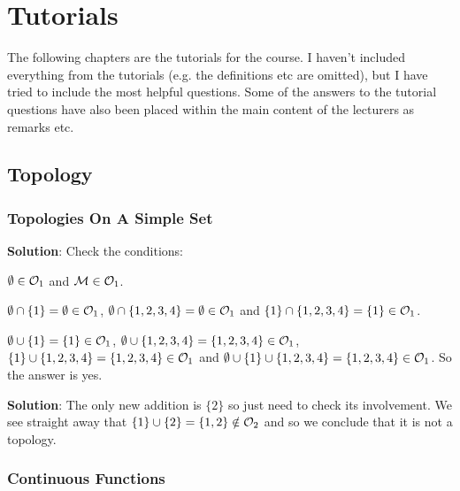 \chapter{Tutorials}

\begin{center}
    The following chapters are the tutorials for the course. I haven't included everything from the tutorials (e.g. the definitions etc are omitted), but I have tried to include the most helpful questions. Some of the answers to the tutorial questions have also been placed within the main content of the lecturers as remarks etc. 
\end{center}

\section{Topology}

\subsection{Topologies On A Simple Set}


\textbf{Solution}: Check the conditions:
\benr 
    \item $\emptyset\in\mathcal{O}_1$ and $\mathcal{M} \in \mathcal{O}_1$. 
    \item $\emptyset\cap\{1\} = \emptyset\in\mathcal{O}_1$, $\emptyset\cap\{1,2,3,4\}=\emptyset\in\mathcal{O}_1$ and $\{1\}\cap\{1,2,3,4\}=\{1\}\in\mathcal{O}_1$. 
    \item $\emptyset\cup\{1\}=\{1\} \in\mathcal{O}_1$, $\emptyset\cup\{1,2,3,4\}=\{1,2,3,4\}\in\mathcal{O}_1$, $\{1\}\cup\{1,2,3,4\}=\{1,2,3,4\}\in\mathcal{O}_1$ and $\emptyset\cup\{1\}\cup\{1,2,3,4\}=\{1,2,3,4\}\in\mathcal{O}_1$.
\een 
So the answer is yes. 

\textbf{Solution}: The only new addition is $\{2\}$ so just need to check its involvement. We see straight away that $\{1\}\cup\{2\} = \{1,2\}\notin\mathcal{O}_2$ and so we conclude that it is not a topology. 

\subsection{Continuous Functions}

